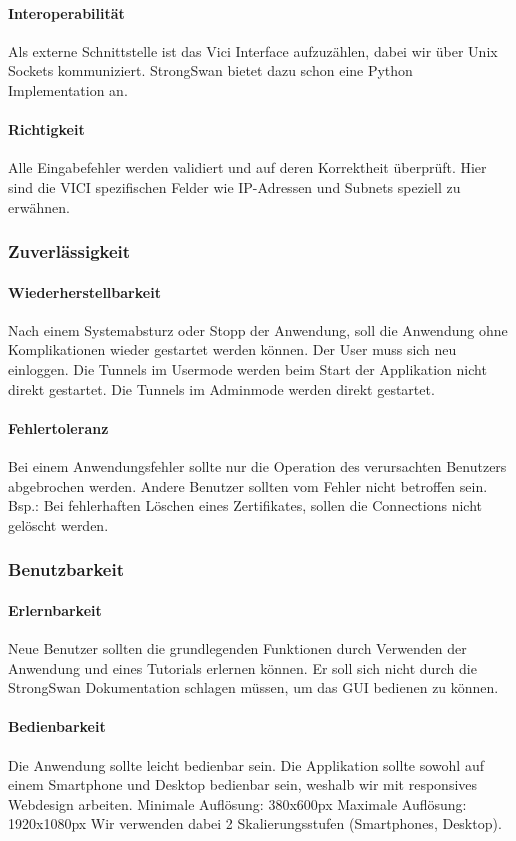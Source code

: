 \paragraph{Interoperabilität}
Als externe Schnittstelle ist das Vici Interface aufzuzählen, dabei wir über Unix Sockets kommuniziert. StrongSwan bietet dazu schon eine Python Implementation an.
\paragraph{Richtigkeit}
Alle Eingabefehler werden validiert und auf deren Korrektheit überprüft. Hier sind die VICI spezifischen Felder wie IP-Adressen und Subnets speziell zu erwähnen.
\subsubsection{Zuverlässigkeit}
\paragraph{Wiederherstellbarkeit}
Nach einem Systemabsturz oder Stopp der Anwendung, soll die Anwendung ohne Komplikationen wieder gestartet werden können. Der User muss sich neu einloggen. Die Tunnels im Usermode werden beim Start der Applikation nicht direkt gestartet. Die Tunnels im Adminmode werden direkt gestartet.
\paragraph{Fehlertoleranz}
Bei einem Anwendungsfehler sollte nur die Operation des verursachten Benutzers abgebrochen werden. Andere Benutzer sollten vom Fehler nicht betroffen sein.\\
Bsp.: Bei fehlerhaften Löschen eines Zertifikates, sollen die Connections nicht gelöscht werden.
\subsubsection{Benutzbarkeit}
\paragraph{Erlernbarkeit}
Neue Benutzer sollten die grundlegenden Funktionen durch Verwenden der Anwendung und eines Tutorials erlernen können. Er soll sich nicht durch die StrongSwan Dokumentation schlagen müssen, um das GUI bedienen zu können.
\paragraph{Bedienbarkeit}
Die Anwendung sollte leicht bedienbar sein. Die Applikation sollte sowohl auf einem Smartphone und Desktop bedienbar sein, weshalb wir mit responsives Webdesign arbeiten.
\medskip
Minimale Auflösung: 	380x600px
Maximale Auflösung: 	1920x1080px
\medskip
Wir verwenden dabei 2 Skalierungsstufen (Smartphones, Desktop).

